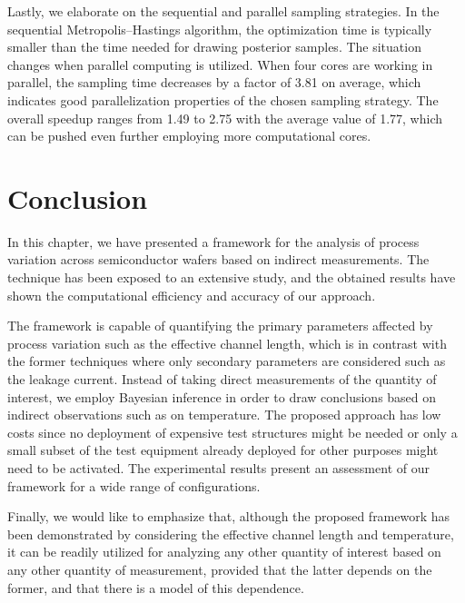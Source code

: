 
Lastly, we elaborate on the sequential and parallel sampling strategies. In the
sequential Metropolis--Hastings algorithm, the optimization time is typically
smaller than the time needed for drawing posterior samples. The situation
changes when parallel computing is utilized. When four cores are working in
parallel, the sampling time decreases by a factor of 3.81 on average, which
indicates good parallelization properties of the chosen sampling strategy. The
overall speedup ranges from 1.49 to 2.75 with the average value of 1.77, which
can be pushed even further employing more computational cores.

\section{Conclusion}

In this chapter, we have presented a framework for the analysis of process
variation across semiconductor wafers based on indirect measurements. The
technique has been exposed to an extensive study, and the obtained results have
shown the computational efficiency and accuracy of our approach.

The framework is capable of quantifying the primary parameters affected by
process variation such as the effective channel length, which is in contrast
with the former techniques where only secondary parameters are considered such
as the leakage current. Instead of taking direct measurements of the quantity of
interest, we employ Bayesian inference in order to draw conclusions based on
indirect observations such as on temperature. The proposed approach has low
costs since no deployment of expensive test structures might be needed or only a
small subset of the test equipment already deployed for other purposes might
need to be activated. The experimental results present an assessment of our
framework for a wide range of configurations.

Finally, we would like to emphasize that, although the proposed framework has
been demonstrated by considering the effective channel length and temperature,
it can be readily utilized for analyzing any other quantity of interest based on
any other quantity of measurement, provided that the latter depends on the
former, and that there is a model of this dependence.
